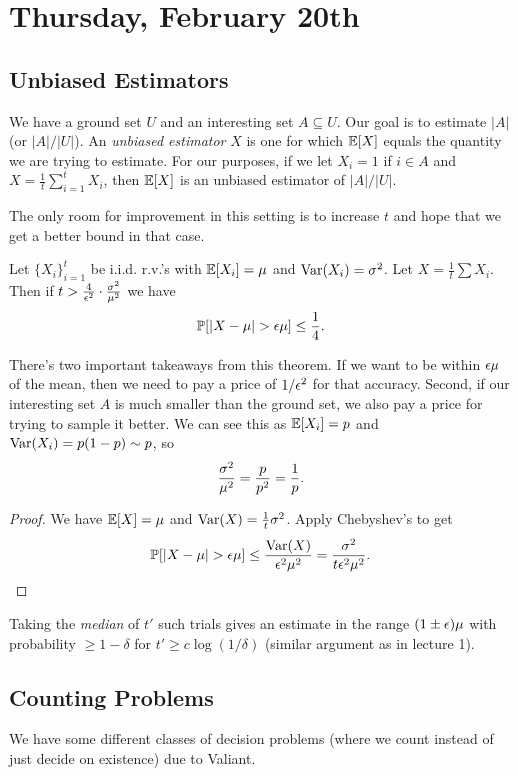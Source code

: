 \documentclass[11 pt]{scrartcl}
\begin{document}
\newpage
\section{Thursday, February 20th}

\subsection{Unbiased Estimators}
We have a ground set $U$ and an interesting set $A\subseteq U$. Our goal is to estimate $|A|$ (or $|A|/|U|$). An \emph{unbiased estimator} $X$ is one for which $\mathbb E[X]$ equals the quantity we are trying to estimate. For our purposes, if we let $X_i = 1$ if $i \in A$ and $X = \frac{1}{t}\sum_{i=1}^t X_i$, then $\mathbb E[X]$ is an unbiased estimator of $|A|/|U|$.  

The only room for improvement in this setting is to increase $t$ and hope that we get a better bound in that case.

\begin{theorem}
    Let $\{X_i\}_{i=1}^t$ be i.i.d. r.v.'s with $\mathbb E[X_i] = \mu$ and $\text{Var}(X_i) = \sigma^2$. Let $X = \frac{1}{t}\sum X_i$. Then if $t > \frac{4}{\epsilon^2}\cdot \frac{\sigma^2}{\mu^2}$ we have 
    \[ \mathbb P[|X-\mu| > \epsilon\mu] \leq \dfrac{1}{4}.\] 
\end{theorem}

There's two important takeaways from this theorem. If we want to be within $\epsilon\mu$ of the mean, then we need to pay a price of $1/\epsilon^2$ for that accuracy. Second, if our interesting set $A$ is much smaller than the ground set, we also pay a price for trying to sample it better. We can see this as $\mathbb E[X_i] = p$ and $\text{Var}(X_i) = p(1-p) \sim p$, so 
\[ \dfrac{\sigma^2}{\mu^2} = \dfrac{p}{p^2} = \dfrac{1}{p}.\] 

\begin{proof}
    We have $\mathbb E[X]=\mu$ and $\text{Var}(X) = \frac{1}{t} \sigma^2$. Apply Chebyshev's to get 
    \[ \mathbb P[|X-\mu| > \epsilon \mu] \leq \dfrac{\text{Var}(X)}{\epsilon^2\mu^2} = \dfrac{\sigma^2}{t\epsilon^2\mu^2}.\] 
\end{proof}
\begin{claim}
    Taking the \emph{median} of $t'$ such trials gives an estimate in the range $(1\pm \epsilon)\mu$ with probability $\geq 1-\delta$ for $t' \geq c\log(1/\delta)$ (similar argument as in lecture 1). 
\end{claim}

\subsection{Counting Problems}
We have some different classes of decision problems (where we count instead of just decide on existence) due to Valiant. 
\end{document}
